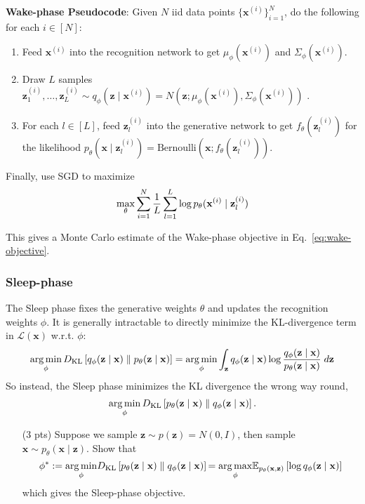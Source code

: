 \textbf{Wake-phase Pseudocode}: Given $N$ iid data points $\{\mathbf{x}^{(i)}\}_{i=1}^N$, do the following for each $i \in [N]$:
\begin{enumerate}
    \item Feed $\mathbf{x}^{(i)}$ into the recognition network to get $\mu_\phi(\mathbf{x}^{(i)})$ and $\Sigma_\phi(\mathbf{x}^{(i)})$.
    \item  Draw $L$ samples {$\mathbf{z}^{(i)}_1, \ldots, \mathbf{z}^{(i)}_L  \sim q_\phi(\mathbf{z} \mid \mathbf{x}^{(i)}) = N(\mathbf{z}; \mu_\phi(\mathbf{x}^{(i)}), \Sigma_\phi (\mathbf{x}^{(i)}))$ }.
    \item For each $l \in [L]$, feed $\mathbf{z}^{(i)}_l$ into the generative network to get {$f_\theta(\mathbf{z}^{(i)}_l)$ for the likelihood $p_\theta(\mathbf{x} \mid \mathbf{z}^{(i)}_l) = \text{Bernoulli}( \mathbf{x} ; f_\theta( \mathbf{z}^{(i)}_l ))$}.
\end{enumerate}
Finally, use SGD to maximize
\begin{equation}
\max_\theta \sum_{i=1}^N {1 \over L} \sum_{l=1}^L \log p_\theta(\mathbf{x}^{(i)} \mid \mathbf{z}^{(i)}_l)
\end{equation}

This gives a Monte Carlo estimate of the Wake-phase objective in Eq.~\eqref{eq:wake-objective}.

\subsubsection{Sleep-phase}

The Sleep phase fixes the generative weights $\theta$ and updates the recognition weights $\phi$. It is generally intractable to directly minimize the KL-divergence term in $\mathcal{L}(\mathbf{x})$ w.r.t. $\phi$:
    \[
    \operatorname*{\mathrm{arg\,min}}_\phi D_{\textrm{KL}}\left[ q_{\phi}(\mathbf{z} \mid \mathbf{x})  \;\|\;  p_\theta(\mathbf{z} \mid \mathbf{x}) \right]
    = \operatorname*{\mathrm{arg\,min}}_\phi \int_{\mathbf{z}} q_\phi(\mathbf{z} \mid \mathbf{x}) \log { q_\phi(\mathbf{z} \mid \mathbf{x}) \over p_\theta(\mathbf{z} \mid \mathbf{x}) } \; d\mathbf{z}
    \]
    So instead, the Sleep phase minimizes the KL divergence the wrong way round,
    \[
    \operatorname*{\mathrm{arg\,min}}_\phi D_{\textrm{KL}}\left[ p_\theta(\mathbf{z} \mid \mathbf{x})  \;\|\;  q_{\phi}(\mathbf{z} \mid \mathbf{x}) \right].
    \]
\begin{itemize}
    \item[(3 pts)] {Suppose we sample $\mathbf{z} \sim p(\mathbf{z}) = N(0, I)$, then sample $\mathbf{x} \sim p_\theta(\mathbf{x} \mid \mathbf{z})$.} Show that
    \begin{equation}
    \phi^* := {\operatorname*{\mathrm{arg\,min}}_\phi} D_{\textrm{KL}}\left[ p_\theta(\mathbf{z} \mid \mathbf{x})  \;\|\;  q_{\phi}(\mathbf{z} \mid \mathbf{x}) \right]
    {=
    \operatorname*{\mathrm{arg\,max}}_\phi} \mathbb{E}_{
    {p_\theta(\mathbf{x}, \mathbf{z})}
    } \left[ \log q_\phi(\mathbf{z} \mid \mathbf{x}) \right]
    \label{eq:sleep-objective}
    \end{equation}
    which gives the Sleep-phase objective.
    \begin{solution}
    \end{solution}
\end{itemize}

